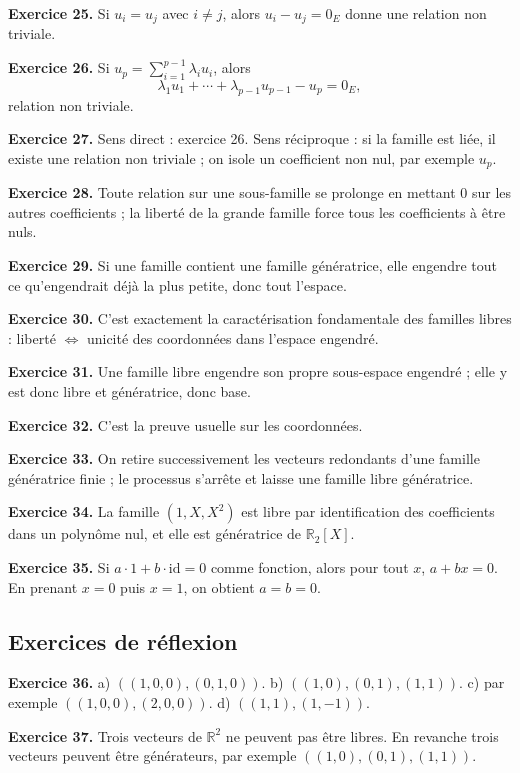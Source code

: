 \documentclass[11pt,a4paper]{article}
\newcommand{\R}{\mathbb R}
\newcommand{\id}{\mathrm{id}}
\begin{document}
\textbf{Exercice 25.} Si $u_i=u_j$ avec $i\neq j$, alors $u_i-u_j=0_E$ donne une relation non triviale.

\textbf{Exercice 26.} Si $u_p=\sum_{i=1}^{p-1}\lambda_i u_i$, alors
\[\lambda_1u_1+\cdots+\lambda_{p-1}u_{p-1}-u_p=0_E,\]
relation non triviale.

\textbf{Exercice 27.} Sens direct : exercice 26. Sens réciproque : si la famille est liée, il existe une relation non triviale ; on isole un coefficient non nul, par exemple $u_p$.

\textbf{Exercice 28.} Toute relation sur une sous-famille se prolonge en mettant $0$ sur les autres coefficients ; la liberté de la grande famille force tous les coefficients à être nuls.

\textbf{Exercice 29.} Si une famille contient une famille génératrice, elle engendre tout ce qu'engendrait déjà la plus petite, donc tout l'espace.

\textbf{Exercice 30.} C'est exactement la caractérisation fondamentale des familles libres : liberté $\Leftrightarrow$ unicité des coordonnées dans l'espace engendré.

\textbf{Exercice 31.} Une famille libre engendre son propre sous-espace engendré ; elle y est donc libre et génératrice, donc base.

\textbf{Exercice 32.} C'est la preuve usuelle sur les coordonnées.

\textbf{Exercice 33.} On retire successivement les vecteurs redondants d'une famille génératrice finie ; le processus s'arrête et laisse une famille libre génératrice.

\textbf{Exercice 34.} La famille $(1,X,X^2)$ est libre par identification des coefficients dans un polynôme nul, et elle est génératrice de $\R_2[X]$.

\textbf{Exercice 35.} Si $a\cdot 1+b\cdot \id=0$ comme fonction, alors pour tout $x$, $a+bx=0$. En prenant $x=0$ puis $x=1$, on obtient $a=b=0$.

\subsection*{Exercices de réflexion}
\textbf{Exercice 36.} a) $((1,0,0),(0,1,0))$. b) $((1,0),(0,1),(1,1))$. c) par exemple $((1,0,0),(2,0,0))$. d) $((1,1),(1,-1))$.

\textbf{Exercice 37.} Trois vecteurs de $\R^2$ ne peuvent pas être libres. En revanche trois vecteurs peuvent être générateurs, par exemple $((1,0),(0,1),(1,1))$.
\end{document}
